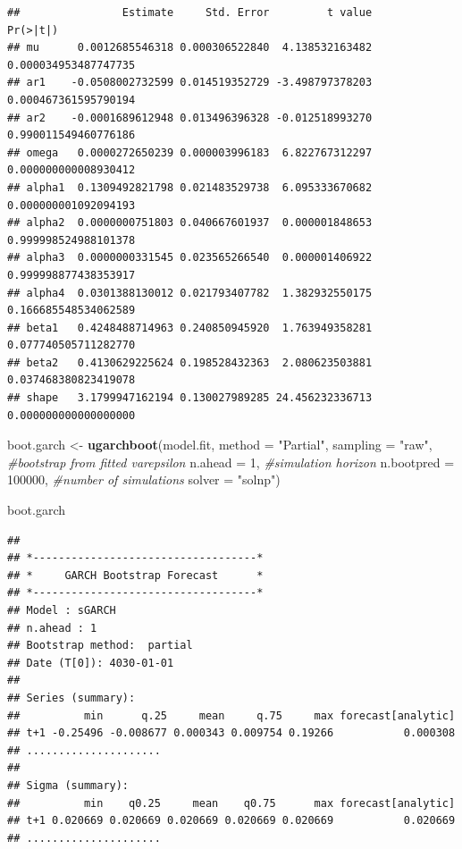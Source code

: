 \documentclass[
]{book}
\newenvironment{Shaded}{\begin{snugshade}}{\end{snugshade}}
\newcommand{\AttributeTok}[1]{\textcolor[rgb]{0.13,0.29,0.53}{#1}}
\newcommand{\CommentTok}[1]{\textcolor[rgb]{0.56,0.35,0.01}{\textit{#1}}}
\newcommand{\DecValTok}[1]{\textcolor[rgb]{0.00,0.00,0.81}{#1}}
\newcommand{\FunctionTok}[1]{\textcolor[rgb]{0.13,0.29,0.53}{\textbf{#1}}}
\newcommand{\NormalTok}[1]{#1}
\newcommand{\OtherTok}[1]{\textcolor[rgb]{0.56,0.35,0.01}{#1}}
\newcommand{\StringTok}[1]{\textcolor[rgb]{0.31,0.60,0.02}{#1}}
\begin{document}
\begin{verbatim}
##                Estimate     Std. Error         t value             Pr(>|t|)
## mu      0.0012685546318 0.000306522840  4.138532163482 0.000034953487747735
## ar1    -0.0508002732599 0.014519352729 -3.498797378203 0.000467361595790194
## ar2    -0.0001689612948 0.013496396328 -0.012518993270 0.990011549460776186
## omega   0.0000272650239 0.000003996183  6.822767312297 0.000000000008930412
## alpha1  0.1309492821798 0.021483529738  6.095333670682 0.000000001092094193
## alpha2  0.0000000751803 0.040667601937  0.000001848653 0.999998524988101378
## alpha3  0.0000000331545 0.023565266540  0.000001406922 0.999998877438353917
## alpha4  0.0301388130012 0.021793407782  1.382932550175 0.166685548534062589
## beta1   0.4248488714963 0.240850945920  1.763949358281 0.077740505711282770
## beta2   0.4130629225624 0.198528432363  2.080623503881 0.037468380823419078
## shape   3.1799947162194 0.130027989285 24.456232336713 0.000000000000000000
\end{verbatim}

\begin{Shaded}
\begin{Highlighting}[]
\NormalTok{boot.garch }\OtherTok{\textless{}{-}} \FunctionTok{ugarchboot}\NormalTok{(model.fit,}
                         \AttributeTok{method =} \StringTok{"Partial"}\NormalTok{,}
                         \AttributeTok{sampling =} \StringTok{"raw"}\NormalTok{,  }\CommentTok{\#bootstrap from fitted varepsilon}
                         \AttributeTok{n.ahead =} \DecValTok{1}\NormalTok{,          }\CommentTok{\#simulation horizon}
                         \AttributeTok{n.bootpred =} \DecValTok{100000}\NormalTok{, }\CommentTok{\#number of simulations }
                         \AttributeTok{solver =} \StringTok{"solnp"}\NormalTok{)}

\NormalTok{boot.garch}
\end{Highlighting}
\end{Shaded}

\begin{verbatim}
## 
## *-----------------------------------*
## *     GARCH Bootstrap Forecast      *
## *-----------------------------------*
## Model : sGARCH
## n.ahead : 1
## Bootstrap method:  partial
## Date (T[0]): 4030-01-01
## 
## Series (summary):
##          min      q.25     mean     q.75     max forecast[analytic]
## t+1 -0.25496 -0.008677 0.000343 0.009754 0.19266           0.000308
## .....................
## 
## Sigma (summary):
##          min    q0.25     mean    q0.75      max forecast[analytic]
## t+1 0.020669 0.020669 0.020669 0.020669 0.020669           0.020669
## .....................
\end{verbatim}
\end{document}
